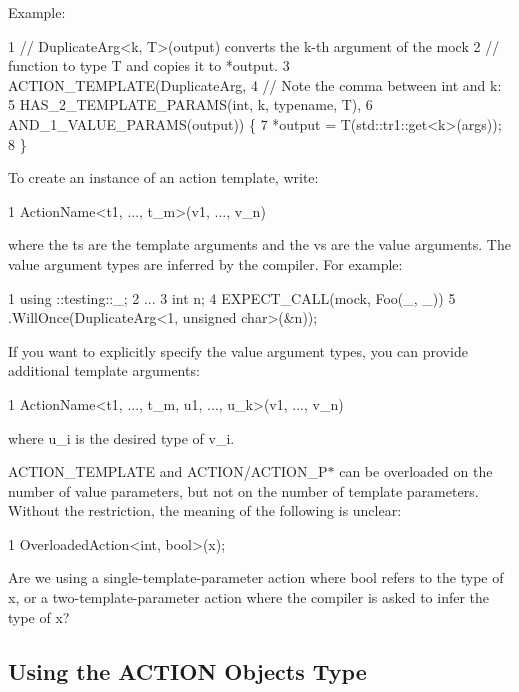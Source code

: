 Example\+: 
\begin{DoxyCode}
1 // DuplicateArg<k, T>(output) converts the k-th argument of the mock
2 // function to type T and copies it to *output.
3 ACTION\_TEMPLATE(DuplicateArg,
4                 // Note the comma between int and k:
5                 HAS\_2\_TEMPLATE\_PARAMS(int, k, typename, T),
6                 AND\_1\_VALUE\_PARAMS(output)) \{
7   *output = T(std::tr1::get<k>(args));
8 \}
\end{DoxyCode}


To create an instance of an action template, write\+: 
\begin{DoxyCode}
1 ActionName<t1, ..., t\_m>(v1, ..., v\_n)
\end{DoxyCode}
 where the {\ttfamily t}s are the template arguments and the {\ttfamily v}s are the value arguments. The value argument types are inferred by the compiler. For example\+: 
\begin{DoxyCode}
1 using ::testing::\_;
2 ...
3   int n;
4   EXPECT\_CALL(mock, Foo(\_, \_))
5       .WillOnce(DuplicateArg<1, unsigned char>(&n));
\end{DoxyCode}


If you want to explicitly specify the value argument types, you can provide additional template arguments\+: 
\begin{DoxyCode}
1 ActionName<t1, ..., t\_m, u1, ..., u\_k>(v1, ..., v\_n)
\end{DoxyCode}
 where {\ttfamily u\+\_\+i} is the desired type of {\ttfamily v\+\_\+i}.

{\ttfamily A\+C\+T\+I\+O\+N\+\_\+\+T\+E\+M\+P\+L\+A\+TE} and {\ttfamily A\+C\+T\+I\+ON}/{\ttfamily A\+C\+T\+I\+O\+N\+\_\+\+P$\ast$} can be overloaded on the number of value parameters, but not on the number of template parameters. Without the restriction, the meaning of the following is unclear\+:


\begin{DoxyCode}
1 OverloadedAction<int, bool>(x);
\end{DoxyCode}


Are we using a single-\/template-\/parameter action where {\ttfamily bool} refers to the type of {\ttfamily x}, or a two-\/template-\/parameter action where the compiler is asked to infer the type of {\ttfamily x}?

\subsection*{Using the A\+C\+T\+I\+ON Object\textquotesingle{}s Type}

